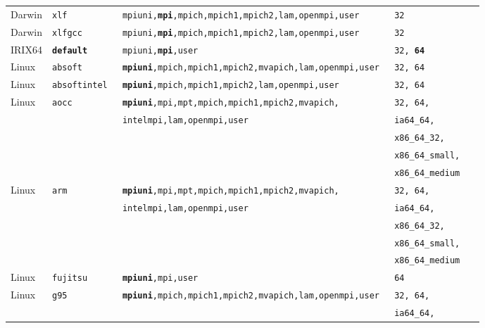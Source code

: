 \begin{longtable}{lllll}
Darwin  &\tt xlf                  &\footnotesize \tt mpiuni,{\bf mpi},mpich,mpich1,mpich2,lam,openmpi,user &\tt 32 \\
Darwin  &\tt xlfgcc               &\footnotesize \tt mpiuni,{\bf mpi},mpich,mpich1,mpich2,lam,openmpi,user &\tt 32 \\
IRIX64  &\tt {\bf default}        &\footnotesize \tt mpiuni,{\bf mpi},user     &\tt 32, {\bf 64} \\
Linux   &\tt absoft               &\footnotesize \tt {\bf mpiuni},mpich,mpich1,mpich2,mvapich,lam,openmpi,user &\tt 32, 64 \\
Linux   &\tt absoftintel          &\footnotesize \tt {\bf mpiuni},mpich,mpich1,mpich2,lam,openmpi,user &\tt 32, 64  \\
Linux   &\tt aocc                 &\footnotesize \tt {\bf mpiuni},mpi,mpt,mpich,mpich1,mpich2,mvapich, &\tt 32, 64, \\
        &                         &\footnotesize \tt intelmpi,lam,openmpi,user                          &\tt ia64\_64, \\
        &                         &                              &\tt x86\_64\_32, \\
        &                         &                              &\tt x86\_64\_small, \\
        &                         &                              &\tt x86\_64\_medium \\
Linux   &\tt arm                  &\footnotesize \tt {\bf mpiuni},mpi,mpt,mpich,mpich1,mpich2,mvapich, &\tt 32, 64, \\
        &                         &\footnotesize \tt intelmpi,lam,openmpi,user                          &\tt ia64\_64, \\
        &                         &                              &\tt x86\_64\_32, \\
        &                         &                              &\tt x86\_64\_small, \\
        &                         &                              &\tt x86\_64\_medium \\
Linux   &\tt fujitsu              &\footnotesize \tt {\bf mpiuni},mpi,user      &\tt 64  \\
Linux   &\tt g95                  &\footnotesize \tt {\bf mpiuni},mpich,mpich1,mpich2,mvapich,lam,openmpi,user &\tt 32, 64, \\
        &                         &                              &\tt ia64\_64, \\

\end{longtable}

